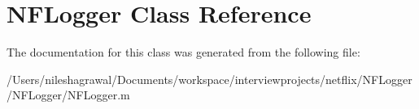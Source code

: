 \hypertarget{class_n_f_logger}{}\section{N\+F\+Logger Class Reference}
\label{class_n_f_logger}


The documentation for this class was generated from the following file\+:\begin{DoxyCompactItemize}
\item 
/\+Users/nileshagrawal/\+Documents/workspace/interviewprojects/netflix/\+N\+F\+Logger/\+N\+F\+Logger/N\+F\+Logger.\+m\end{DoxyCompactItemize}
